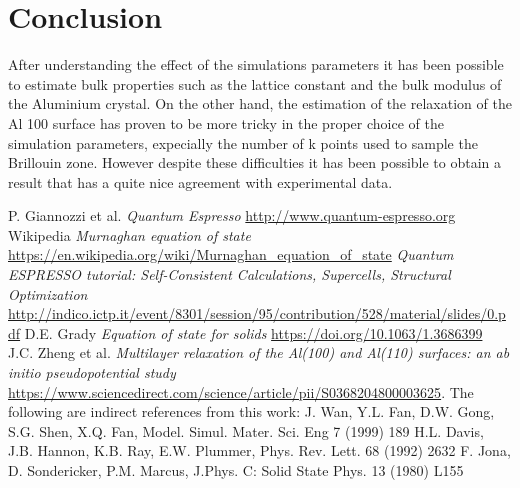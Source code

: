 \documentclass[a4paper, 11pt]{article}
\begin{document}
\section{Conclusion}
  After understanding the effect of the simulations parameters it has been possible to estimate bulk properties such as the lattice constant and the bulk modulus of the Aluminium crystal. On the other hand, the estimation of the relaxation of the Al 100 surface has proven to be more tricky in the proper choice of the simulation parameters, expecially the number of k points used to sample the Brillouin zone. However despite these difficulties it has been possible to obtain a result that has a quite nice agreement with experimental data.
















\begin{thebibliography}{100}
   P. Giannozzi et al. \emph{Quantum Espresso}  \url{http://www.quantum-espresso.org}
   Wikipedia \emph{Murnaghan equation of state}  \url{https://en.wikipedia.org/wiki/Murnaghan_equation_of_state}
    \emph{Quantum ESPRESSO tutorial:  Self-Consistent Calculations, Supercells, Structural Optimization}  \url{http://indico.ictp.it/event/8301/session/95/contribution/528/material/slides/0.pdf}
   D.E. Grady \emph{Equation of state for solids}  \url{https://doi.org/10.1063/1.3686399}
   J.C. Zheng et al. \emph{Multilayer  relaxation  of  the  Al(100)  and  Al(110)  surfaces: an  ab  initio  pseudopotential  study}  \url{https://www.sciencedirect.com/science/article/pii/S0368204800003625}.
  The following are indirect references from this work:
   J. Wan, Y.L. Fan, D.W. Gong, S.G. Shen, X.Q. Fan, Model. Simul. Mater. Sci. Eng 7 (1999) 189
   H.L. Davis, J.B. Hannon, K.B. Ray, E.W. Plummer, Phys. Rev. Lett. 68 (1992) 2632
   F. Jona, D. Sondericker, P.M. Marcus, J.Phys. C: Solid State Phys. 13 (1980) L155
\end{thebibliography}
\end{document}
